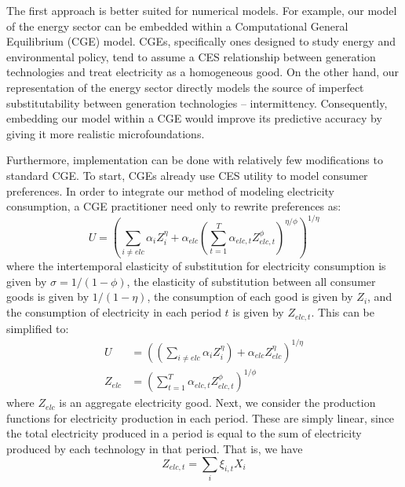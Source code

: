 \documentclass[11pt,a4paper,leqno]{extarticle}
\begin{document}
	The first approach is better suited for numerical models. For example, our model of the energy sector can be embedded within a Computational General Equilibrium (CGE) model. CGEs, specifically ones designed to study energy and environmental policy, tend to assume a CES relationship between generation technologies and treat electricity as a homogeneous good. On the other hand, our representation of the energy sector directly models the source of imperfect substitutability between generation technologies -- intermittency. Consequently, embedding our model within a CGE would improve its predictive accuracy by giving it more realistic microfoundations. 
	
	Furthermore, implementation can be done with relatively few modifications to standard CGE. To start, CGEs already use CES utility to model consumer preferences. In order to integrate our method of modeling electricity consumption, a CGE practitioner need only to rewrite preferences as:
	\begin{equation}
	U =   \left( \sum_{i \neq elc} \alpha_{i} Z_{i}^\eta +  \alpha_{elc} \left( \sum_{t=1}^T \alpha_{elc,t} Z_{elc, t}^\phi \right)^{\eta/\phi} \right)^{1/\eta}
	\end{equation}
	where the intertemporal elasticity of substitution for electricity consumption is given by $\sigma = 1/(1-\phi)$,  the elasticity of substitution between all consumer goods is given by $1/(1-\eta)$, the consumption of each good is given by $Z_{i}$, and the consumption of electricity in each period $t$ is given by $Z_{elc, t}$. This can be simplified to: 
	\begin{align}
	U &= \left(  \left( \sum_{i \neq elc} \alpha_{i} Z_{i}^\eta \right) + \alpha_{elc} Z_{elc}^\eta \right)^{1/\eta} \\
	Z_{elc} &= \left(  \sum_{t=1}^T \alpha_{elc,t} Z_{elc, t}^\phi \right)^{1/\phi}
	\end{align}
	where $Z_{elc}$ is an aggregate electricity good. Next, we consider the production functions for electricity production in each period. These are simply linear, since the total  electricity produced in a period is equal to the sum of electricity produced by each technology in that period. That is, we have 
	\begin{equation}
	Z_{elc,t} = \sum_i \xi_{i,t} X_i 
	\end{equation}
\end{document}
